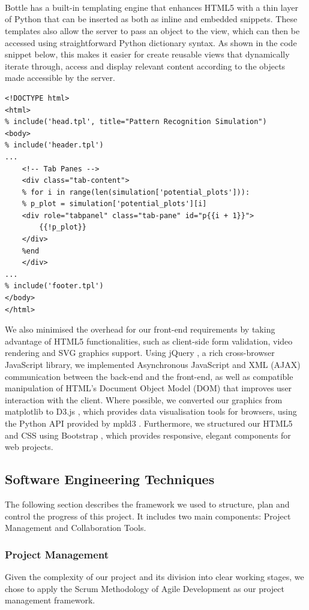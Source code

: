 \documentclass[a4paper,11pt]{article}
\begin{document}
\\
\\
\\ 
Bottle has a built-in templating engine that enhances HTML5 with a thin layer of Python that can be inserted as both as inline and embedded snippets. These templates also allow the server to pass an object to the view, which can then be accessed using straightforward Python dictionary syntax. As shown in the code snippet below, this makes it easier for create reusable views that dynamically iterate through, access and display relevant content according to the objects made accessible by the server.

\begin{verbatim}
<!DOCTYPE html>
<html>
% include('head.tpl', title="Pattern Recognition Simulation")
<body>
% include('header.tpl')
...
	<!-- Tab Panes -->
	<div class="tab-content">
	% for i in range(len(simulation['potential_plots'])):
	% p_plot = simulation['potential_plots'][i]
	<div role="tabpanel" class="tab-pane" id="p{{i + 1}}">
		{{!p_plot}}
	</div>
	%end
	</div>
...
% include('footer.tpl')
</body>
</html>
\end{verbatim}

We also minimised the overhead for our front-end requirements by taking advantage of HTML5 functionalities, such as client-side form validation, video rendering and SVG graphics support. Using jQuery \cite{jquery}, a rich cross-browser JavaScript library, we implemented Asynchronous JavaScript and XML (AJAX) communication between the back-end and the front-end, as well as compatible manipulation of HTML's Document Object Model (DOM) that improves user interaction with the client. Where possible, we converted our graphics from matplotlib to D3.js \cite{d3js}, which provides data visualisation tools for browsers, using the Python API provided by mpld3 \cite{mpld3}. Furthermore, we structured our HTML5 and CSS using Bootstrap \cite{bstrap}, which provides responsive, elegant components for web projects. 


\subsection{Software Engineering Techniques}
The following section describes the framework we used to structure, plan and control the progress of this project.
It includes two main components: Project Management and Collaboration Tools.
\subsubsection{Project Management}
Given the complexity of our project and its division into clear working stages, we chose to apply the Scrum Methodology of Agile Development as our project management framework.
\end{document}
